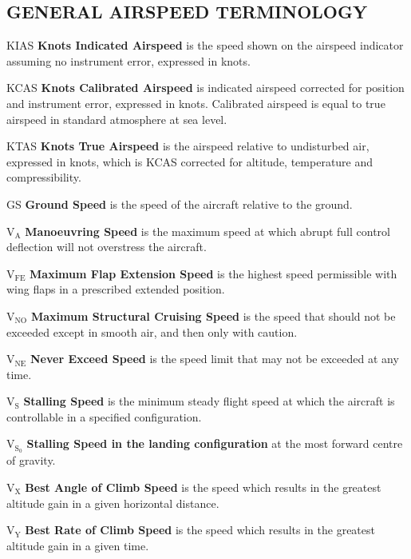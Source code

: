 \subsection{GENERAL AIRSPEED TERMINOLOGY} 
\begin{Description}
	\item[KIAS] \textbf{Knots Indicated Airspeed} is the speed shown on the airspeed indicator assuming no instrument error, expressed in knots.
	
	
	\item[KCAS] \textbf{Knots Calibrated Airspeed} is indicated airspeed corrected for position and instrument error, expressed in knots. Calibrated airspeed is equal to true airspeed in standard atmosphere at sea level.
	
	
	\item[KTAS] \textbf{Knots True Airspeed} is the airspeed relative to undisturbed air, expressed in knots, which is KCAS corrected for altitude, temperature and compressibility. 
	\item[GS] \textbf{Ground Speed} is the speed of the aircraft relative to the ground. 
	\item[$\mathrm{V_{A}}$] \textbf{Manoeuvring Speed} is the maximum speed at which abrupt full control deflection will not overstress the aircraft. 
	\item[$\mathrm{V_{FE}}$] \textbf{Maximum Flap Extension Speed} is the highest speed permissible with wing flaps in a prescribed extended position. 
	\item[$\mathrm{V_{NO}}$] \textbf{Maximum Structural Cruising Speed} is the speed that should not be exceeded except in smooth air, and then only with caution. 
	\item[$\mathrm{V_{NE}}$] \textbf{Never Exceed Speed} is the speed limit that may not be exceeded at any time. 
	\item[$\mathrm{V_{S}}$] \textbf{Stalling Speed} is the minimum steady flight speed at which the aircraft is controllable in a specified configuration. 
	\item[$\mathrm{V_{S_{0}}}$] \textbf{Stalling Speed in the landing configuration} at the most forward centre of gravity. 
	\item[$\mathrm{V_{X}}$] \textbf{Best Angle of Climb Speed} is the speed which results in the greatest altitude gain in a given horizontal distance. 
	\item[$\mathrm{V_{Y}}$] \textbf{Best Rate of Climb Speed} is the speed which results in the greatest altitude gain in a given time. 
\end{Description}

